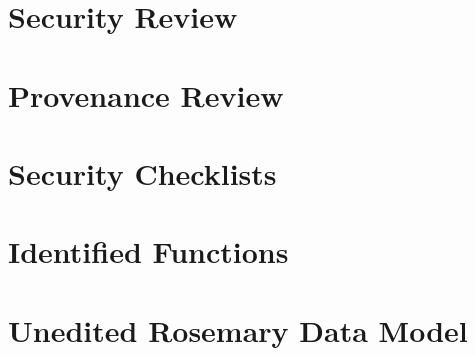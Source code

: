 \documentclass[a4paper]{report}
\begin{document}
	
	
	\chapter{Security Review}
	\label{security-review-appendix}
	
	
	
	
	
	\chapter{Provenance Review}
	\label{provenance-review-appendix}
	
	
	
	\chapter{Security Checklists}
	\label{security-appendix}
	
	
	
	\chapter{Identified Functions}
	\label{identified-functions}
	
	
	
	\chapter{Unedited Rosemary Data Model}
	\label{unedited-datamodel}
	
	
\end{document}
